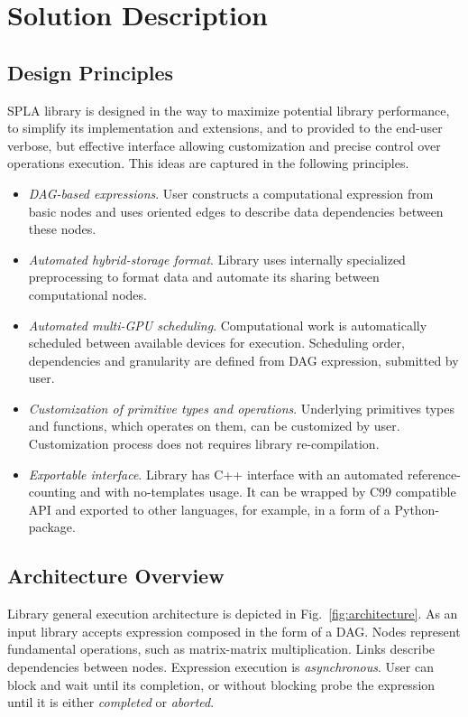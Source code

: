 \section{Solution Description}

\subsection{Design Principles}

SPLA library is designed in the way to maximize potential library performance, to simplify its implementation and extensions, and to provided to the end-user verbose, but effective interface allowing customization and precise control over operations execution. This ideas are captured in the following principles.

\begin{itemize}
    \item \textit{DAG-based expressions}. User constructs a computational expression from basic nodes and uses oriented edges to describe data dependencies between these nodes. 
    \item \textit{Automated hybrid-storage format}. Library uses internally specialized preprocessing to format data and automate its sharing between computational nodes.
    \item \textit{Automated multi-GPU scheduling}. Computational work is automatically scheduled between available devices for execution. Scheduling order, dependencies and granularity are defined from DAG expression, submitted by user.
    \item \textit{Customization of primitive types and operations}. Underlying primitives types and functions, which operates on them, can be customized by user. Customization process does not requires library re-compilation. 
    \item \textit{Exportable interface}. Library has C++ interface with an automated reference-counting and with no-templates usage. It can be wrapped by C99 compatible API and exported to other languages, for example, in a form of a Python-package.
\end{itemize}

\subsection{Architecture Overview}

Library general execution architecture is depicted in Fig.~\ref{fig:architecture}. As an input library accepts expression composed in the form of a DAG.
Nodes represent fundamental operations, such as matrix-matrix multiplication. 
Links describe dependencies between nodes.
Expression execution is \textit{asynchronous}. 
User can block and wait until its completion, or without blocking probe the expression until it is either \textit{completed} or \textit{aborted}. 

